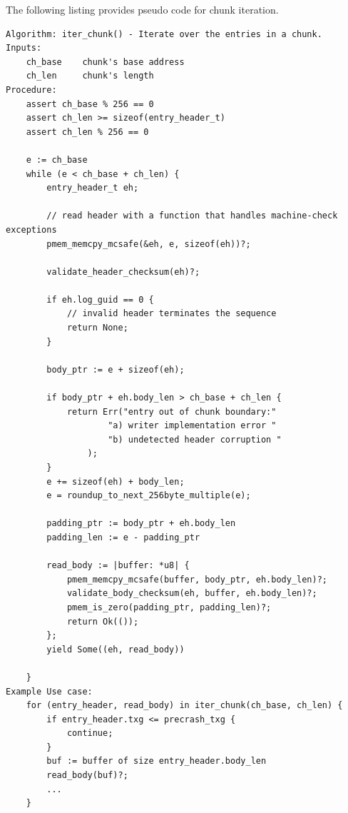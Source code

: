 \documentclass[12pt,a4paper,twoside]{book}
\begin{document}
The following listing provides pseudo code for chunk iteration.
\begin{lstlisting}
Algorithm: iter_chunk() - Iterate over the entries in a chunk.
Inputs:
    ch_base    chunk's base address
    ch_len     chunk's length
Procedure:
    assert ch_base % 256 == 0
    assert ch_len >= sizeof(entry_header_t)
    assert ch_len % 256 == 0

    e := ch_base
    while (e < ch_base + ch_len) {
        entry_header_t eh;

        // read header with a function that handles machine-check exceptions
        pmem_memcpy_mcsafe(&eh, e, sizeof(eh))?;

        validate_header_checksum(eh)?;

        if eh.log_guid == 0 {
            // invalid header terminates the sequence
            return None;
        }

        body_ptr := e + sizeof(eh);

        if body_ptr + eh.body_len > ch_base + ch_len {
            return Err("entry out of chunk boundary:"
                    "a) writer implementation error "
                    "b) undetected header corruption "
                );
        }
        e += sizeof(eh) + body_len;
        e = roundup_to_next_256byte_multiple(e);

        padding_ptr := body_ptr + eh.body_len
        padding_len := e - padding_ptr

        read_body := |buffer: *u8| {
            pmem_memcpy_mcsafe(buffer, body_ptr, eh.body_len)?;
            validate_body_checksum(eh, buffer, eh.body_len)?;
            pmem_is_zero(padding_ptr, padding_len)?;
            return Ok(());
        };
        yield Some((eh, read_body))

    }
Example Use case:
    for (entry_header, read_body) in iter_chunk(ch_base, ch_len) {
        if entry_header.txg <= precrash_txg {
            continue;
        }
        buf := buffer of size entry_header.body_len
        read_body(buf)?;
        ...
    }
\end{lstlisting}



\end{document}
